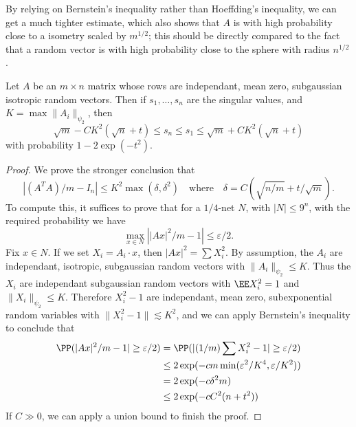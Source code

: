 By relying on Bernstein's inequality rather than Hoeffding's inequality, we can get a much tighter estimate, which also shows that $A$ is with high probability close to a isometry scaled by $m^{1/2}$; this should be directly compared to the fact that a random vector is with high probability close to the sphere with radius $n^{1/2}$.

\begin{theorem}
    Let $A$ be an $m \times n$ matrix whose rows are independant, mean zero, subgaussian isotropic random vectors. Then if $s_1, \dots, s_n$ are the singular values, and $K = \max \| A_i \|_{\psi_2}$, then
    \[ \sqrt{m} - CK^2(\sqrt{n} + t) \leq s_n \leq s_1 \leq \sqrt{m} + CK^2(\sqrt{n} + t) \]
    with probability $1 - 2\exp(-t^2)$.
\end{theorem}
\begin{proof}
    We prove the stronger conclusion that
    \[ |(A^TA)/m - I_n| \leq K^2 \max(\delta,\delta^2)\quad\text{where}\quad \delta = C \left( \sqrt{n/m} + t/\sqrt{m} \right). \]
    To compute this, it suffices to prove that for a $1/4$-net $N$, with $|N| \leq 9^n$, with the required probability we have
    \[ \max_{x \in N} \left| |Ax|^2/m - 1 \right| \leq \varepsilon/2. \]
    Fix $x \in N$. If we set $X_i = A_i \cdot x$, then $|Ax|^2 = \sum X_i^2$. By assumption, the $A_i$ are independant, isotropic, subgaussian random vectors with $\| A_i \|_{\psi_2} \leq K$. Thus the $X_i$ are independant subgaussian random vectors with $\EE X_i^2 = 1$ and $\| X_i \|_{\psi_2} \leq K$. Therefore $X_i^2 - 1$ are independant, mean zero, subexponential random variables with $\| X_i^2 - 1 \| \lesssim K^2$, and we can apply Bernstein's inequality to conclude that
    \begin{align*}
        \PP(|Ax|^2/m - 1| \geq \varepsilon/2) &= \PP(|(1/m) \sum X_i^2 - 1| \geq \varepsilon/2)\\
        &\leq 2 \exp(-c m \min(\varepsilon^2/K^4, \varepsilon/K^2))\\
        &= 2 \exp(-c \delta^2 m)\\
        &\leq 2 \exp(-c C^2 (n + t^2))
    \end{align*}
    If $C \gg 0$, we can apply a union bound to finish the proof.
\end{proof}



